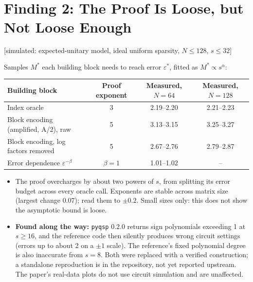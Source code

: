 \documentclass[10pt]{article}
\newcommand{\evlabel}[1]{\textsf{\small[#1]}}
\newenvironment{sectionblock}
{%
    \par
    \vspace{2pt}
    \noindent
    \begin{minipage}{\textwidth}
}
{%
    \end{minipage}
    \par
    \vspace{5pt}
}
\begin{document}
\begin{sectionblock}

\section{Finding 2: The Proof Is Loose, but Not Loose Enough}
\label{sec:f2}

\evlabel{simulated: expected-unitary model, ideal uniform sparsity, $N\le 128$, $s\le 32$}

\vspace{2pt}
Samples $M^{*}$ each building block needs to reach error $\varepsilon^{*}$, fitted as $M^{*}\propto s^{\alpha}$:

\vspace{2pt}
\begin{center}
\small
\begin{tabularx}{\textwidth}{@{}lCCC@{}}
\toprule
\textbf{Building block} & \textbf{Proof exponent} & \textbf{Measured, $N=64$} & \textbf{Measured, $N=128$} \\
\midrule
Index oracle & 3 & 2.19--2.20 & 2.21--2.23 \\
Block encoding (amplified, A/2), raw & 5 & 3.13--3.15 & 3.25--3.27 \\
Block encoding, log factors removed & 5 & 2.67--2.76 & 2.79--2.87 \\
Error dependence $\varepsilon^{-\beta}$ & $\beta=1$ & 1.01--1.02 & -- \\
\bottomrule
\end{tabularx}
\end{center}

\begin{itemize}
    \item The proof overcharges by about two powers of $s$, from splitting its error budget across every oracle call. Exponents are stable across matrix size (largest change 0.07); read them to $\pm 0.2$. Small sizes only: this does not show the asymptotic bound is loose.
    \item \textbf{Found along the way:} \texttt{pyqsp} 0.2.0 \cite{martyn2021} returns sign polynomials exceeding 1 at $s\ge16$, and the reference code then silently produces wrong circuit settings (errors up to about 2 on a $\pm1$ scale). The reference's fixed polynomial degree is also inaccurate from $s=8$. Both were replaced with a verified construction; a standalone reproduction is in the repository, not yet reported upstream. The paper's real-data plots do not use circuit simulation and are unaffected.
\end{itemize}

\end{sectionblock}
\end{document}
